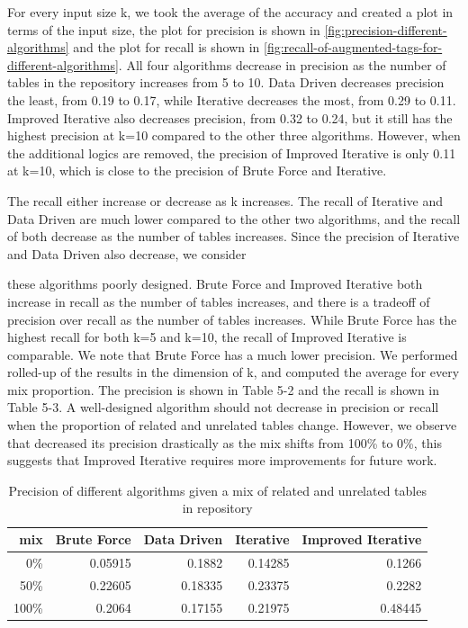 For every input size k, we took the average of the accuracy and created a plot in terms of the input size, the plot for precision is shown in \autoref{fig:precision-different-algorithms} and the plot for recall is shown in \autoref{fig:recall-of-augmented-tags-for-different-algorithms}. All four algorithms decrease in precision as the number of tables in the repository increases from 5 to 10. Data Driven decreases precision the least, from 0.19 to 0.17, while Iterative decreases the most, from 0.29 to 0.11. Improved Iterative also decreases precision, from 0.32 to 0.24, but it still has the highest precision at k=10 compared to the other three algorithms. However, when the additional logics are removed, the precision of Improved Iterative is only 0.11 at k=10, which is close to the precision of Brute Force and Iterative.

The recall either increase or decrease as k increases. The recall of Iterative and Data Driven are much lower compared to the other two algorithms, and the recall of both decrease as the number of tables increases. Since the precision of Iterative and Data Driven also decrease, we consider

these algorithms poorly designed. Brute Force and Improved Iterative both increase in recall as the number of tables increases, and there is a tradeoff of precision over recall as the number of tables increases. While Brute Force has the highest recall for both k=5 and k=10, the recall of Improved Iterative is comparable. We note that Brute Force has a much lower precision.
We performed rolled-up of the results in the dimension of k, and computed the average for every mix proportion. The precision is shown in Table 5-2 and the recall is shown in Table 5-3. A well-designed algorithm should not decrease in precision or recall when the proportion of related and unrelated tables change. However, we observe that decreased its precision drastically as the mix shifts from 100\% to 0\%, this suggests that Improved Iterative requires more improvements for future work.

\begin{table}[h!]
    \centering
    \scriptsize
    \begin{center}
      \caption{Precision of different algorithms given a mix of related and unrelated tables in repository}
      \label{tab:Precision-of-different-algorithms-given-a-mix-of-related-and-unrelated-tables-in-repository}
      \begin{tabular}{|r|r|r|r|r|}
        \hline
        \textbf{mix} & \textbf{Brute Force} & \textbf{Data Driven} & \textbf{Iterative} & \textbf{Improved Iterative} \\
        \hline
        0\% & 0.05915 & 0.1882 & 0.14285 & 0.1266 \\
        \hline
        50\% & 0.22605 & 0.18335 & 0.23375 & 0.2282 \\
        \hline
        100\% & 0.2064 & 0.17155 & 0.21975 & 0.48445 \\
        \hline
      \end{tabular}
    \end{center}
\end{table}

